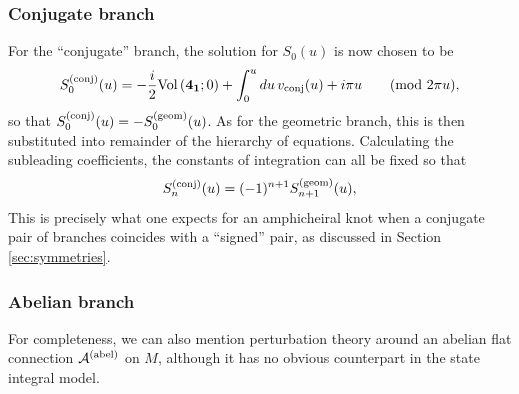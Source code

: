 \documentclass[hyper]{JHEP3}
\def\CA {{\cal A}}
\newcommand\be{\begin{equation}}
\newcommand\ee{\end{equation}}
\newcommand{\Vol}{{\mbox{Vol\,}}}
\begin{document}
\subsubsection*{Conjugate branch}

For the ``conjugate'' branch, the solution for $S_0(u)$ is now chosen to be
\be
S_0^{({\rm conj})} (u) = -\frac{i}{2}\Vol({\bf 4_1};0) + \int_0^u du\, v_{{\rm conj}} (u) + i\pi u
\qquad (\mbox{mod $2\pi u$}),
\label{CS0}
\ee
so that $S_0^{({\rm conj})}(u) = -S_0^{({\rm geom})}(u)$.
As for the geometric branch, this is then substituted into remainder
of the hierarchy of equations. Calculating the subleading coefficients, the constants of integration can all be fixed so that
\be
S_n^{({\rm conj})} (u) = (-1)^{n+1} S_{n+1}^{({\rm geom})} (u),
\label{CGrel}
\ee
This is precisely what one expects for an amphicheiral knot when a conjugate pair of branches coincides with a ``signed'' pair, as discussed in Section \ref{sec:symmetries}.


\subsubsection*{Abelian branch}

For completeness, we can also mention perturbation theory around
an abelian flat connection $\CA^{({\rm abel})}$ on $M$,
although it has no obvious counterpart in the state integral model.
\end{document}
